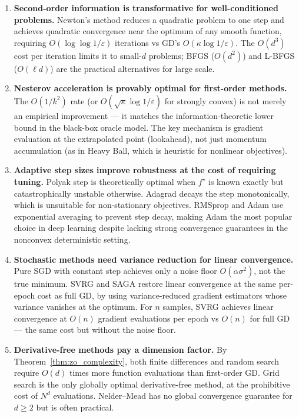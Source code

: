\documentclass[11pt,a4paper]{article}
\theoremstyle{definition}
\begin{document}
\begin{enumerate}
\item \textbf{Second-order information is transformative for well-conditioned problems.} Newton's method reduces a quadratic problem to one step and achieves quadratic convergence near the optimum of any smooth function, requiring $O(\log\log 1/\varepsilon)$ iterations vs GD's $O(\kappa \log 1/\varepsilon)$. The $O(d^3)$ cost per iteration limits it to small-$d$ problems; BFGS ($O(d^2)$) and L-BFGS ($O(\ell d)$) are the practical alternatives for large scale.

\item \textbf{Nesterov acceleration is provably optimal for first-order methods.} The $O(1/k^2)$ rate (or $O(\sqrt{\kappa}\log 1/\varepsilon)$ for strongly convex) is not merely an empirical improvement --- it matches the information-theoretic lower bound in the black-box oracle model. The key mechanism is gradient evaluation at the extrapolated point (lookahead), not just momentum accumulation (as in Heavy Ball, which is heuristic for nonlinear objectives).

\item \textbf{Adaptive step sizes improve robustness at the cost of requiring tuning.} Polyak step is theoretically optimal when $f^{\star}$ is known exactly but catastrophically unstable otherwise. Adagrad decays the step monotonically, which is unsuitable for non-stationary objectives. RMSprop and Adam use exponential averaging to prevent step decay, making Adam the most popular choice in deep learning despite lacking strong convergence guarantees in the nonconvex deterministic setting.

\item \textbf{Stochastic methods need variance reduction for linear convergence.} Pure SGD with constant step achieves only a noise floor $O(\alpha\sigma^2)$, not the true minimum. SVRG and SAGA restore linear convergence at the same per-epoch cost as full GD, by using variance-reduced gradient estimators whose variance vanishes at the optimum. For $n$ samples, SVRG achieves linear convergence at $O(n)$ gradient evaluations per epoch vs $O(n)$ for full GD --- the same cost but without the noise floor.

\item \textbf{Derivative-free methods pay a dimension factor.} By Theorem~\ref{thm:zo_complexity}, both finite differences and random search require $O(d)$ times more function evaluations than first-order GD. Grid search is the only globally optimal derivative-free method, at the prohibitive cost of $N^d$ evaluations. Nelder--Mead has no global convergence guarantee for $d \geq 2$ but is often practical.


\end{enumerate}
\end{document}
